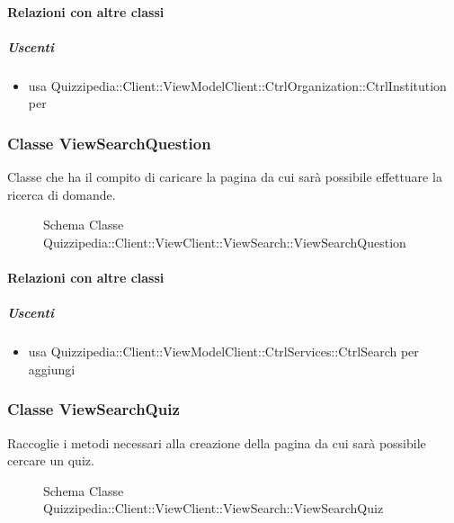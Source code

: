 \paragraph{Relazioni con altre classi}
\subparagraph{Uscenti}
\begin{itemize}
\item usa Quizzipedia::Client::ViewModelClient::CtrlOrganization::CtrlInstitution per 
\end{itemize}
\subsubsection{Classe ViewSearchQuestion}
Classe che ha il compito di caricare la pagina da cui sarà possibile effettuare la ricerca di domande.
\begin{figure}[H]
\centering
\noindent{}
\caption[Schema Classe ViewSearchQuestion]{Schema Classe Quizzipedia::Client::ViewClient::ViewSearch::ViewSearchQuestion}
\end{figure}
\paragraph{Relazioni con altre classi}
\subparagraph{Uscenti}
\begin{itemize}
\item usa Quizzipedia::Client::ViewModelClient::CtrlServices::CtrlSearch per aggiungi
\end{itemize}
\subsubsection{Classe ViewSearchQuiz}
Raccoglie i metodi necessari alla creazione della pagina da cui sarà possibile cercare un quiz.
\begin{figure}[H]
\centering
\noindent{}
\caption[Schema Classe ViewSearchQuiz]{Schema Classe Quizzipedia::Client::ViewClient::ViewSearch::ViewSearchQuiz}
\end{figure}
